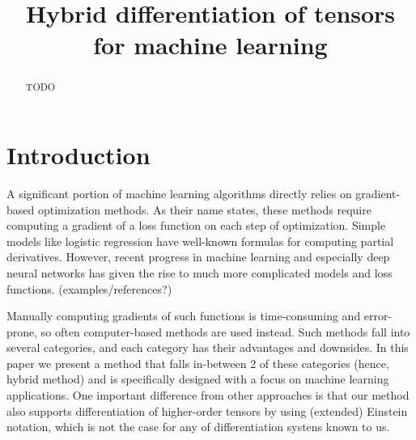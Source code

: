 \documentclass[conference]{IEEEtran}
\begin{document}
\title{Hybrid differentiation of tensors \\ for machine learning}


\author{
\and
{}
\and
{}
}

\maketitle


\begin{abstract}
TODO


\end{abstract}


\IEEEpeerreviewmaketitle


\section{Introduction}

A significant portion of machine learning algorithms directly relies on gradient-based optimization methods. As their name states, these methods require computing a gradient of a loss function on each step of optimization. Simple models like logistic regression have well-known formulas for computing partial derivatives. However, recent progress in machine learning and especially deep neural networks has given the rise to much more complicated models and loss functions. (examples/references?) 

Manually computing gradients of such functions is time-consuming and error-prone, so often computer-based methods are used instead. Such methods fall into several categories, and each category has their advantages and downsides. In this paper we present a method that falls in-between 2 of these categories (hence, hybrid method) and is specifically designed with a focus on machine learning applications. One important difference from other approaches is that our method also supports differentiation of higher-order tensors by using (extended) Einstein notation, which is not the case for any of differentiation systens known to us.
\end{document}
